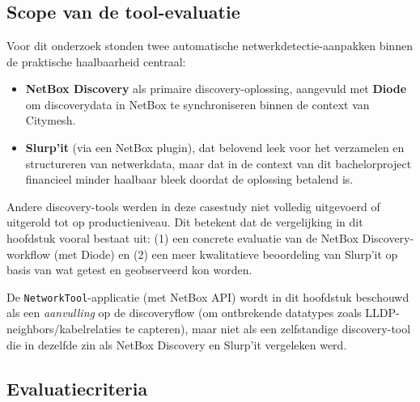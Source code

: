 
\chapter{}%
\label{ch:fase2}

\section{Scope van de tool-evaluatie}

Voor dit onderzoek stonden twee automatische netwerkdetectie-aanpakken binnen de praktische haalbaarheid centraal:

\begin{itemize}
  \item \textbf{NetBox Discovery} als primaire discovery-oplossing, aangevuld met \textbf{Diode} om discoverydata in NetBox te synchroniseren binnen de context van Citymesh.
  \item \textbf{Slurp'it} (via een NetBox plugin), dat belovend leek voor het verzamelen en structureren van netwerkdata, maar dat in de context van dit bachelorproject financieel minder haalbaar bleek doordat de oplossing betalend is.
\end{itemize}

Andere discovery-tools werden in deze casestudy niet volledig uitgevoerd of uitgerold tot op productieniveau. Dit betekent dat de vergelijking in dit hoofdstuk vooral bestaat uit: (1) een concrete evaluatie van de NetBox Discovery-workflow (met Diode) en (2) een meer kwalitatieve beoordeling van Slurp'it op basis van wat getest en geobserveerd kon worden.

De \texttt{NetworkTool}-applicatie (met NetBox API) wordt in dit hoofdstuk beschouwd als een \emph{aanvulling} op de discoveryflow (om ontbrekende datatypes zoals LLDP-neighbors/kabelrelaties te capteren), maar niet als een zelfstandige discovery-tool die in dezelfde zin als NetBox Discovery en Slurp'it vergeleken werd.

\section{Evaluatiecriteria}

